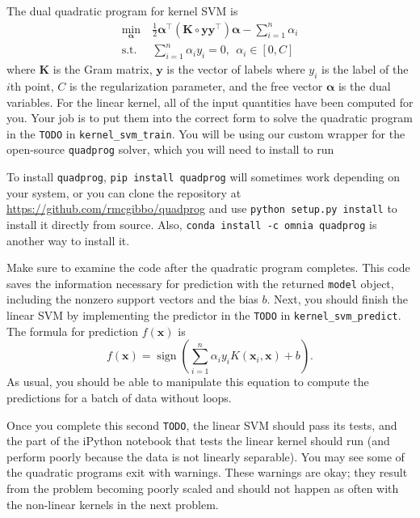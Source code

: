\documentclass[10pt]{article}
\newcommand{\bx}{{\boldsymbol x}}
\newcommand{\by}{{\boldsymbol y}}
\newcommand{\bK}{\mathbf{K}}
\newcommand{\alphavec}{{\boldsymbol \alpha}}
\DeclareMathOperator*{\sign}{sign}
\begin{document}
\begin{enumerate}
The dual quadratic program for kernel SVM is
\begin{equation}
\begin{aligned}
\min_{\alphavec} ~ & \frac{1}{2} \alphavec^\top (\bK \circ \by \by^\top) \alphavec - \sum_{i=1}^n \alpha_i\\
\textrm{s.t.} ~ & \sum_{i=1}^n \alpha_i y_i = 0, ~~ \alpha_i \in [0, C]
\end{aligned}
\end{equation}
where $\bK$ is the Gram matrix, $\by$ is the vector of labels where $y_i$ is the label of the $i$th point, $C$ is the regularization parameter, and the free vector $\alphavec$ is the dual variables. For the linear kernel, all of the input quantities have been computed for you. Your job is to put them into the correct form to solve the quadratic program in the \texttt{TODO} in \texttt{kernel\_svm\_train}. You will be using our custom wrapper for the open-source \texttt{quadprog} solver, which you will need to install to run

To install \texttt{quadprog}, \texttt{pip install quadprog} will sometimes work depending on your system, or you can clone the repository at \url{https://github.com/rmcgibbo/quadprog} and use \texttt{python setup.py install} to install it directly from source.
Also, \texttt{conda install -c omnia quadprog} is another way to install it.

Make sure to examine the code after the quadratic program completes. This code saves the information necessary for prediction with the returned \texttt{model} object, including the nonzero support vectors and the bias $b$. Next, you should finish the linear SVM by implementing the predictor in the \texttt{TODO} in \texttt{kernel\_svm\_predict}. The formula for prediction $f(\bx)$ is 
\begin{equation}
f(\bx) = \sign\left(\sum_{i=1}^n \alpha_i y_i K(\bx_i, \bx) + b\right).
\end{equation}
As usual, you should be able to manipulate this equation to compute the predictions for a batch of data without loops.

Once you complete this second \texttt{TODO}, the linear SVM should pass its tests, and the part of the iPython notebook that tests the linear kernel should run (and perform poorly because the data is not linearly separable). You may see some of the quadratic programs exit with warnings. These warnings are okay; they result from the problem becoming poorly scaled and should not happen as often with the non-linear kernels in the next problem.


\end{enumerate}
\end{document}
